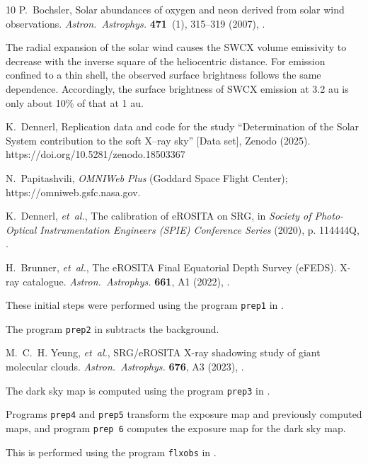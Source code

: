 \documentclass[12pt]{article}
\newcommand*\aap{Astron.~Astrophys.}
\begin{document}
\begin{thebibliography}{10}
P.~{Bochsler}, {Solar abundances of oxygen and neon derived from solar wind
  observations}. \emph{\aap} \textbf{471}~(1), 315--319 (2007),
  .

The radial expansion of the solar wind causes the SWCX volume emissivity to
  decrease with the inverse square of the heliocentric distance. For emission
  confined to a thin shell, the observed surface brightness follows the same
  dependence. Accordingly, the surface brightness of SWCX emission at 3.2 au is
  only about 10\% of that at 1 au.

 K.~Dennerl, Replication data and code for the study
``Determination of the Solar System contribution to the soft X--ray sky''
[Data set], Zenodo (2025).\\
https://doi.org/10.5281/zenodo.18503367

N.~Papitashvili, {\sl OMNIWeb Plus} (Goddard Space Flight Center);
https://omniweb.gsfc.nasa.gov.

K.~{Dennerl}, \emph{et~al.}, {The calibration of eROSITA on SRG}, in
  \emph{Society of Photo-Optical Instrumentation
  Engineers (SPIE) Conference Series} (2020), p. 114444Q,
  .

H.~{Brunner}, \emph{et~al.}, {The eROSITA Final Equatorial Depth Survey
  (eFEDS). X-ray catalogue}. \emph{\aap} \textbf{661}, A1 (2022),
  .

These initial steps were performed using the program {\tt prep1} in \cite{zenodo_doi}.

The program {\tt prep2} in \cite{zenodo_doi} subtracts the background.

M.~C.~H. {Yeung}, \emph{et~al.}, {SRG/eROSITA X-ray shadowing study of giant
  molecular clouds}. \emph{\aap} \textbf{676}, A3 (2023),
  .

The dark sky map is computed using the program {\tt prep3} in \cite{zenodo_doi}.

Programs {\tt prep4} and {\tt prep5} transform the exposure map and previously computed
  maps, and program {\tt prep 6} computes the exposure map for the dark sky map.

This is performed using the program {\tt flxobs} in \cite{zenodo_doi}.


\end{thebibliography}
\end{document}

